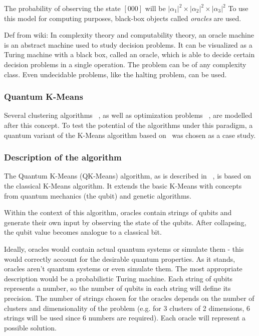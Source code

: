 The probability of observing the state $[000]$ will be $|\alpha_1|^2 \times |\alpha_2|^2 \times |\alpha_3|^2$
To use this model for computing purposes, black-box objects called \emph{oracles} are used.


Def from wiki: In complexity theory and computability theory, an oracle machine is an abstract machine used to study decision problems. It can be visualized as a Turing machine with a black box, called an oracle, which is able to decide certain decision problems in a single operation. The problem can be of any complexity class. Even undecidable problems, like the halting problem, can be used. %




\subsubsection{Quantum K-Means}

Several clustering algorithms ~\cite{Casper2013,Casper,Xiao2010}, as well as optimization problems ~\cite{Wang2013}, are modelled after this concept. To test the potential of the algorithms under this paradigm, a quantum variant of the K-Means algorithm based on~\cite{Casper} was chosen as a case study.

\subsubsection{Description of the algorithm}

The Quantum K-Means (QK-Means) algorithm, as is described in ~\cite{Casper}, is based on the classical K-Means algorithm. It extends the basic K-Means with concepts from quantum mechanics (the qubit) and genetic algorithms.

Within the context of this algorithm, oracles contain strings of \gls{qubit}s and generate their own input by observing the state of the \gls{qubit}s. After collapsing, the \gls{qubit} value becomes analogue to a classical bit.


Ideally, oracles would contain actual quantum systems or simulate them - this would correctly account for the desirable quantum properties. As it stands, oracles aren't quantum systems or even simulate them. The most appropriate description would be a probabilistic Turing machine.
Each string of \gls{qubit}s represents a number, so the number of \gls{qubit}s in each string will define its precision. The number of strings chosen for the oracles depends on the number of clusters and dimensionality of the problem (e.g. for 3 clusters of 2 dimensions, 6 strings will be used since 6 numbers are required). Each oracle will represent a possible solution.

